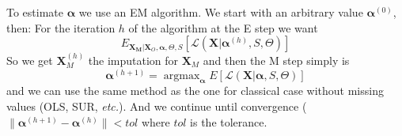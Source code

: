 \documentclass[11pt,a4paper]{report}
\begin{document}
%			
%	
To estimate $\boldsymbol{\alpha}$ we use an EM algorithm. We start with an arbitrary value $\boldsymbol{\alpha}^{(0)}$, then:
For the iteration $h$ of the algorithm at the E step we want 
\begin{equation}
	E_{\boldsymbol{X}_{\boldsymbol{M}}|\boldsymbol{X}_O,\boldsymbol{\alpha},\Theta,S}\left[\mathcal{L}(\boldsymbol{X}|\boldsymbol{\alpha}^{(h)},S,\Theta)\right]
\end{equation}
So we get $\boldsymbol{X}_M^{(h)}$ the  imputation for $\boldsymbol{X}_M$ and then the M step simply is
\begin{equation}
	\boldsymbol{\alpha}^{(h+1)}=\operatorname{argmax}_{\boldsymbol{\alpha}}E\left[\mathcal{L}(\boldsymbol{X}|\boldsymbol{\alpha},S,\Theta) \right]
\end{equation}
and we can use the same method as the one for classical case without missing values (OLS, SUR, {\it etc.}).
		And we continue until convergence ($\parallel \boldsymbol{\alpha}^{(h+1)} - \boldsymbol{\alpha}^{(h)}\parallel < tol $ where $tol$ is the tolerance.\\
		
\end{document}
